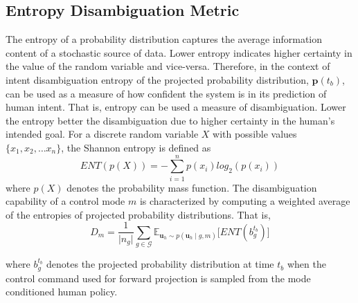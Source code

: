\documentclass[conference]{IEEEtran}
\begin{document}
\subsection{Entropy Disambiguation Metric}\label{sssec:ent}
The entropy of a probability distribution captures the average information content of a stochastic source of data. Lower entropy indicates higher certainty in the value of the random variable and vice-versa. Therefore, in the context of intent disambiguation entropy of the projected probability distribution, $\boldsymbol{p}(t_b)$, can be used as a measure of how confident the system is in its prediction of human intent. That is, entropy can be used a measure of disambiguation. Lower the entropy better the disambiguation due to higher certainty in the human's intended goal. For a discrete random variable $X$ with possible values $\{x_1, x_2,\dots x_n\}$, the Shannon entropy is defined as 
\begin{equation*}
ENT(p(X)) = -\sum_{i = 1}^{n} p(x_i)log_2(p(x_i))
\end{equation*}
where $p(X)$ denotes the probability mass function.
The disambiguation capability of a control mode $m$ is characterized by computing a weighted average of the entropies of projected probability distributions. That is, 
\begin{equation}
	D_m = \frac{1}{\vert n_g \vert} \sum_{g \in \mathcal{G}}^{} \mathbb{E}_{\boldsymbol{u}_h \sim p(\boldsymbol{u}_h \; | \; g, m)}\Big[ENT(b_g^{t_b})\Big]
\end{equation}

where $b_g^{t_b}$ denotes the projected probability distribution at time $t_b$ when the control command used for forward projection is sampled from the mode conditioned human policy. 
\end{document}
